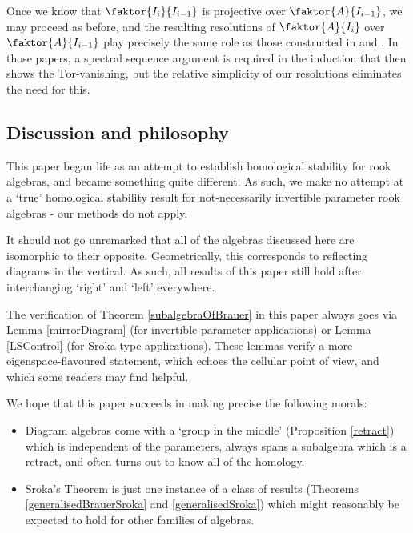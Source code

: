 \documentclass[12pt]{amsart}
\theoremstyle{plain}
\theoremstyle{definition} \newtheorem{definition}[theorem]{Definition}
\theoremstyle{plain}
\theoremstyle{plain} \newtheorem{proposition}[theorem]{Proposition}
\theoremstyle{plain} \newtheorem{conjecture}[theorem]{Conjecture}
\theoremstyle{plain} \newtheorem{corollary}[theorem]{Corollary}
\theoremstyle{remark} \newtheorem{claim}[theorem]{Claim}
\theoremstyle{remark} \newtheorem{remark}[theorem]{Remark}
\theoremstyle{remark} \newtheorem{example}[theorem]{Example}
\theoremstyle{remark} \newtheorem{comment}[theorem]{Comment}
\theoremstyle{definition} \newtheorem{question}[theorem]{Question}
\newcommand{\Tor}{\mathrm{Tor}}
\begin{document}
Once we know that $\faktor{I_i}{I_{i-1}}$ is projective over $\faktor{A}{I_{i-1}}$, we may proceed as before, and the resulting resolutions of $\faktor{A}{I_{i}}$ over $\faktor{A}{I_{i-1}}$ play precisely the same role as those constructed in \cite{BH} and \cite{BHP}. In those papers, a spectral sequence argument is required in the induction that then shows the $\Tor$-vanishing, but the relative simplicity of our resolutions eliminates the need for this.

\subsection{Discussion and philosophy}

This paper began life as an attempt to establish homological stability for rook algebras, and became something quite different. As such, we make no attempt at a `true' homological stability result for not-necessarily invertible parameter rook algebras - our methods do not apply.

It should not go unremarked that all of the algebras discussed here are isomorphic to their opposite. Geometrically, this corresponds to reflecting diagrams in the vertical. As such, all results of this paper still hold after interchanging `right' and `left' everywhere.

The verification of Theorem \ref{subalgebraOfBrauer} in this paper always goes via Lemma \ref{mirrorDiagram} (for invertible-parameter applications) or Lemma \ref{LSControl} (for Sroka-type applications). These lemmas verify a more eigenspace-flavoured statement, which echoes the cellular point of view, and which some readers may find helpful.

We hope that this paper succeeds in making precise the following morals:
\begin{itemize}
    \item Diagram algebras come with a `group in the middle' (Proposition \ref{retract}) which is independent of the parameters, always spans a subalgebra which is a retract, and often turns out to know all of the homology.
    \item Sroka's Theorem \cite{Sroka} is just one instance of a class of results (Theorems \ref{generalisedBrauerSroka} and \ref{generalisedSroka}) which might reasonably be expected to hold for other families of algebras.
\end{itemize}
\end{document}
